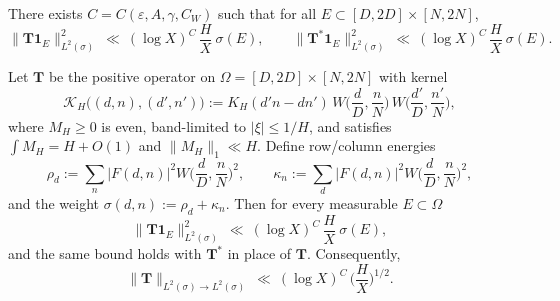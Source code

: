 \begin{lemma}\label{lem:BG.Sawyer}
There exists $C=C(\varepsilon,A,\gamma,C_W)$ such that for all $E\subset [D,2D]\times[N,2N]$,
\begin{equation}\label{eq:BG.forward}
\|\mathbf T\mathbf 1_E\|_{L^2(\sigma)}^2 \ \ll\ (\log X)^C\,\frac{H}{X}\ \sigma(E),\qquad
\|\mathbf T^\ast\mathbf 1_E\|_{L^2(\sigma)}^2 \ \ll\ (\log X)^C\,\frac{H}{X}\ \sigma(E).
\end{equation}
\end{lemma}

\begin{lemma}\label{lem:TubeSawyer}
Let $\mathbf T$ be the positive operator on $\Omega=[D,2D]\times[N,2N]$ with kernel
\[
\mathcal K_H\!\big((d,n),(d',n')\big):=K_H(d'n-dn')\,W\!\Big(\frac dD,\frac nN\Big)\,W\!\Big(\frac{d'}D,\frac{n'}N\Big),
\]
where $M_H\ge 0$ is even, band-limited to $|\xi|\le 1/H$, and satisfies $\int M_H = H+O(1)$ and $\|\widehat{M_H}\|_1\ll H$.
Define row/column energies
\[
\rho_d:=\sum_n |F(d,n)|^2 W\!\Big(\frac dD,\frac nN\Big)^2,\qquad \kappa_n:=\sum_d |F(d,n)|^2 W\!\Big(\frac dD,\frac nN\Big)^2,
\]
and the weight $\sigma(d,n):=\rho_d+\kappa_n$. Then for every measurable $E\subset\Omega$
\begin{equation}\label{eq:TubeTestForward}
\|\mathbf T \mathbf 1_E\|_{L^2(\sigma)}^2 \ \ll\ (\log X)^{C}\,\frac{H}{X}\ \sigma(E),
\end{equation}
and the same bound holds with $\mathbf T^\ast$ in place of $\mathbf T$. Consequently,
\[
\|\mathbf T\|_{L^2(\sigma)\to L^2(\sigma)}\ \ll\ (\log X)^{C}\,\Big(\frac{H}{X}\Big)^{1/2}.
\]
\end{lemma}

